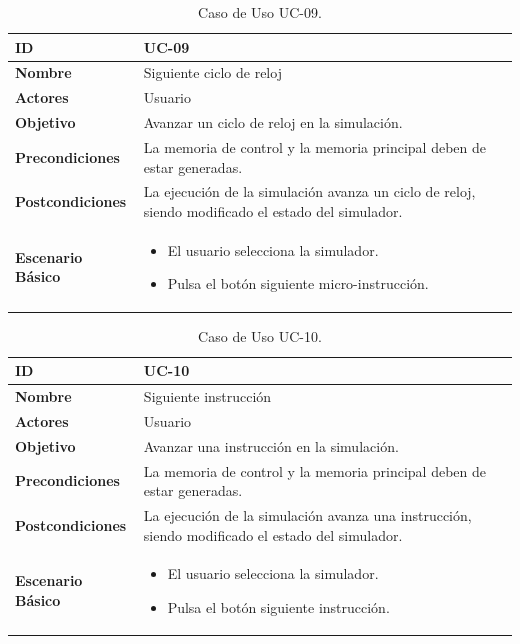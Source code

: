 \begin{center}
\begin{table}[htbp]
\centering
\begin{tabular}{@{}p{2.5cm} p{9cm}@{}} 
\toprule
\textbf{ID}	& UC-09  \\
\midrule
\textbf{Nombre} 		& Siguiente ciclo de reloj   \\
\midrule
\textbf{Actores} 		&	Usuario  \\
\midrule
\textbf{Objetivo} 	&	Avanzar un ciclo de reloj en la simulación.	 \\
\midrule
\textbf{Precondiciones}	&	La memoria de control y la memoria principal deben de estar generadas.  \\
\midrule
\textbf{Postcondiciones} 	& La ejecución de la simulación avanza un ciclo de reloj, siendo modificado el estado del simulador.   \\
\midrule
\textbf{Escenario Básico} 	&  \begin{itemize}
\item El usuario selecciona la simulador.
\item Pulsa el botón siguiente micro-instrucción.
\end{itemize} \\
\bottomrule
\end{tabular}
\caption{Caso de Uso UC-09.}
\label{tab:uc09}
\end{table}
\end{center}

\begin{center}
\begin{table}[htbp]
\centering
\begin{tabular}{@{}p{2.5cm} p{9cm}@{}} 
\toprule
\textbf{ID}	& UC-10  \\
\midrule
\textbf{Nombre} 		& Siguiente instrucción   \\
\midrule
\textbf{Actores} 		&	Usuario  \\
\midrule
\textbf{Objetivo} 	&	Avanzar una instrucción en la simulación.	 \\
\midrule
\textbf{Precondiciones}	&	La memoria de control y la memoria principal deben de estar generadas.  \\
\midrule
\textbf{Postcondiciones} 	& La ejecución de la simulación avanza una instrucción, siendo modificado el estado del simulador.   \\
\midrule
\textbf{Escenario Básico} 	&  \begin{itemize}
\item El usuario selecciona la simulador.
\item Pulsa el botón siguiente instrucción.
\end{itemize} \\
\bottomrule
\end{tabular}
\caption{Caso de Uso UC-10.}
\label{tab:uc10}
\end{table}
\end{center}

